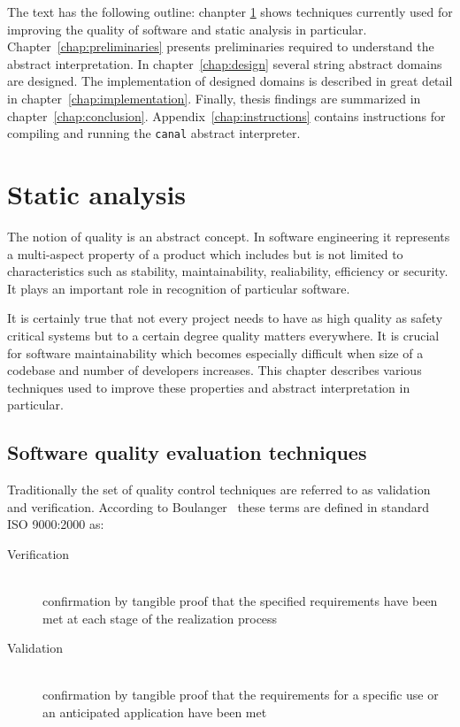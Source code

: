 \documentclass[12pt,final,oneside]{fithesis2}
\theoremstyle{definition}
\begin{document}
The text has the following outline: chanpter \ref{chap:staticanalysis} shows
techniques currently used for improving the quality of software and static
analysis in particular. Chapter~\ref{chap:preliminaries}
presents preliminaries required to understand the abstract interpretation.
In chapter~\ref{chap:design} several string abstract domains are designed.
The implementation of designed domains is described in great detail in
chapter~\ref{chap:implementation}. Finally, thesis findings are summarized
in chapter~\ref{chap:conclusion}. Appendix~\ref{chap:instructions} contains
instructions for compiling and running the \texttt{canal} abstract
interpreter.


\chapter{Static analysis}
\label{chap:staticanalysis}

The notion of quality is an abstract concept. In software engineering it
represents a multi-aspect property of a product which includes but is not
limited to characteristics such as stability, maintainability, realiability,
efficiency or security. It plays an important role in recognition of
particular software.

It is certainly true that not every project needs to have as high quality as
safety critical systems but to a certain degree quality matters
everywhere. It is crucial for software maintainability which becomes
especially difficult when size of a codebase and number of developers
increases. This chapter describes various techniques used to
improve these properties and abstract interpretation in particular.


\section{Software quality evaluation techniques}

Traditionally the set of quality control techniques are referred to as
validation and verification. According to
Boulanger~\cite{Boulanger12-1} these terms are defined in standard
ISO 9000:2000 as:

\begin{description}

\item[Verification] \hfill \\
confirmation by tangible proof that the specified requirements have
been met at each stage of the realization process

\item[Validation] \hfill \\
confirmation by tangible proof that the requirements for a specific use or
an anticipated application have been met

\end{description}
\end{document}
